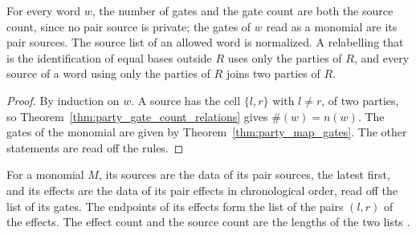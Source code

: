 \begin{theorem}
    \label{thm:party_word_sources}
    \leanok
    For every word $w$, the number of gates and the gate count are both the source
    count, since no pair source is private; the gates of $w$ read as a monomial are its
    pair sources. The source list of an allowed word is normalized. A relabelling
    that is the identification of equal bases outside $R$ uses only the parties of $R$,
    and every source of a word using only the parties of $R$ joins two parties of $R$.
\end{theorem}
\begin{proof}\leanok
    By induction on $w$. A source has the cell $\{l,r\}$ with $l\neq r$, of two
    parties, so Theorem~\ref{thm:party_gate_count_relations} gives $\#(w)=n(w)$. The
    gates of the monomial are given by Theorem~\ref{thm:party_map_gates}. The other
    statements are read off the rules.
\end{proof}

\begin{definition}
    \label{def:party_monomial_effects}
    \leanok
    For a monomial $M$, its sources are the data of its pair sources, the latest first,
    and its effects are the data of its pair effects in chronological order, read off
    the list of its gates. The endpoints of its effects form the list of the pairs
    $(l,r)$ of the effects. The effect count and the source count are the lengths of
    the two lists \cite[Section~5.1]{OpenAI2026PolynomialPEPS}.
\end{definition}

